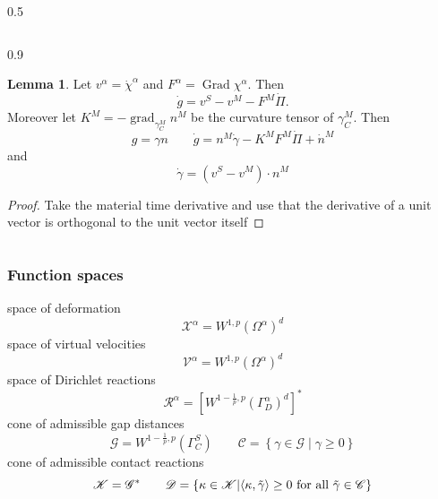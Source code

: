\documentclass[8pt]{beamer}
\numberwithin{equation}{section}
\theoremstyle{definition}
\newtheorem{lem}[prop]{Lemma}
\DeclareMathOperator{\Grad}{Grad}
\DeclareMathOperator{\grad}{grad}
\DeclarePairedDelimiter{\dual}{\langle}{\rangle}
\begin{document}
\begin{frame}
\begin{columns}
\begin{column}{0.5\framewidth}
\end{column}
\end{columns}

\begin{columns}
\begin{column}{0.9\framewidth}
\begin{lem}
Let $v^\alpha=\dot\chi^\alpha$ and $F^\alpha=\Grad\chi^\alpha$. Then
\[
\dot g=v^S-v^M-F^M\dot\Pi.
\]
Moreover let $K^M=-\grad_{\gamma_C^M}n^M$ be the curvature tensor of $\gamma_C^M$. Then
\[
g=\gamma n\qquad\dot g=n^M\dot\gamma-K^MF^M\dot\Pi+\dot n^M
\]
and
\[
\dot\gamma=(v^S-v^M)\cdot n^M
\]
\end{lem}
\begin{proof}
Take the material time derivative and use that the derivative of a unit vector is orthogonal to the unit vector itself
\end{proof}
\end{column}
\end{columns}
\end{frame}

\begin{frame}
\frametitle{Function spaces}

\centering
space of deformation
\[
\mathscr{X}^\alpha=W^{1,p}(\Omega^\alpha)^d
\]
space of virtual velocities
\[
\mathscr{V}^\alpha=W^{1,p}(\Omega^\alpha)^d
\]
space of Dirichlet reactions
\[
\mathcal{R}^\alpha=\left[W^{1-\frac{1}{p},p}(\Gamma_D^\alpha)^d\right]^*
\]
cone of admissible gap distances
\[
\mathscr{G}=W^{1-\frac{1}{p},p}(\Gamma_C^S)\qquad\mathscr{C}=\left\{\gamma\in\mathscr{G}\middle|\gamma\ge0\right\}
\]
cone of admissible contact reactions
\[
\mathscr{K}=\mathscr{G}^*\qquad\mathscr{D}=\left\{\kappa\in\mathscr{K}\middle|\text{$\dual{\kappa,\tilde\gamma}\ge0$ for all $\tilde\gamma\in\mathscr{C}$}\right\}
\]
\end{frame}
\end{document}
